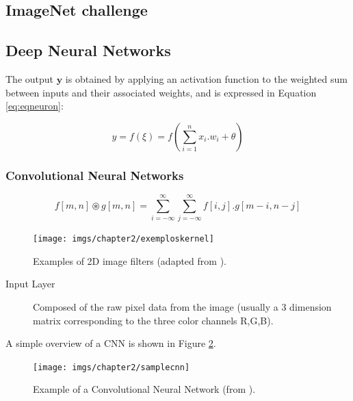 \subsection{ImageNet challenge}




\subsection{Deep Neural Networks}


 The output $\mathbf{y}$ is obtained by applying an activation function to the weighted sum between inputs and their associated weights, and is expressed in Equation \ref{eq:eqneuron}:  

\begin{equation}\label{eq:eqneuron}
    y = f(\xi) = f(\sum_{i=1}^{n} x_i.w_i + \theta)
\end{equation}


\subsubsection{Convolutional Neural Networks}


\begin{equation}\label{eqn:1}
f[m,n] \circledast g[m,n] = \sum_{i=-{\infty}}^{\infty} \sum_{j=-{\infty}}^{\infty} f[i,j] . g[m-i,n-j]
\end{equation}


\begin{figure}[h] 
\centerline{\texttt{[image: imgs/chapter2/exemploskernel]}}
\caption{Examples of 2D image filters (adapted from \cite{masterkernel}).}
\label{fig:exemploskernel}
\end{figure}





\begin{description}

 \item[Input Layer] Composed of the raw pixel data from the image (usually a 3 dimension matrix corresponding to the three color channels R,G,B).
 
\end{description}


A simple overview of a \ac{CNN} is shown in Figure \ref{fig:sampleCNN}.


\begin{figure}[h] 
\centerline{\texttt{[image: imgs/chapter2/samplecnn]}}
\caption{ Example of a Convolutional Neural Network  (from \cite{tese}).}
\label{fig:sampleCNN}
\end{figure}

